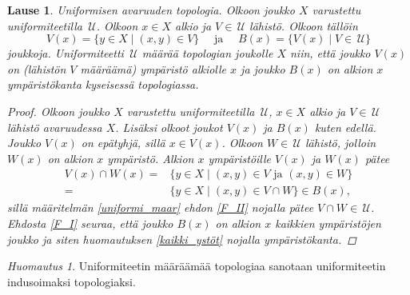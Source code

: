 \documentclass[12pt,a4paper,leqno]{report}
\newcommand{\U}{\,\mathcal{U}}
\theoremstyle{plain}
\newtheorem{lause}[equation]{Lause}
\theoremstyle{definition}
\theoremstyle{remark}
\newtheorem{huom}[equation]{Huomautus}
\begin{document}
\begin{lause}
Uniformisen avaruuden topologia.
Olkoon joukko $X$ varustettu uniformiteetilla $\U$.
Olkoon $x\in X$ 
alkio ja $V\in\U$ lähistö. 
Olkoon tällöin %
\begin{equation*}V(x)=\{ y\in X\mid (x,y)\in V \}
\quad\text{ ja }\quad
B(x)=\{ V(x)\mid V\in\U \}
\end{equation*}
joukkoja.
Uniformiteetti $\U$ määrää topologian joukolle $X$ niin, 
että joukko $V(x)$ on (lähistön $V$ määräämä) ympäristö 
alkiolle $x$ ja joukko $B(x)$ on alkion $x$ 
ympäristökanta kyseisessä topologiassa.
\begin{proof}
Olkoon joukko $X$ varustettu uniformiteetilla $\U$, 
$x\in X$ alkio ja $V\in\U$ lähistö avaruudessa $X$. Lisäksi olkoot joukot $V(x)$ ja $B(x)$ kuten edellä. 
%
Joukko $V(x)$ on epätyhjä, sillä $x\in V(x)$.
Olkoon $W\in\U$ lähistö, jolloin $W(x)$ on alkion $x$ ympäristö. 
Alkion $x$ ympäristöille $V(x)$ ja $W(x)$ pätee
\begin{align*}
V(x)\cap W(x) =&\{ y\in X\mid (x,y)\in V \text{ ja } (x,y)\in W \}\\
=&\{ y\in X\mid (x,y)\in V\cap W \}
\in B(x),
\end{align*} 
sillä määritelmän \ref{uniformi_maar} ehdon \ref{F_II} 
nojalla pätee $ V\cap W \in \U$. 
Ehdosta \ref{F_I} seuraa, että 
joukko $B(x)$ on alkion $x$ kaikkien ympäristöjen joukko ja siten 
huomautuksen \ref{kaikki_ystöt} nojalla ympäristökanta.
\end{proof}
\end{lause}
\begin{huom}\label{unif_indusoitu_topo}
Uniformiteetin määräämää topologiaa sanotaan uniformiteetin indusoimaksi topologiaksi.
\end{huom}
\end{document}
